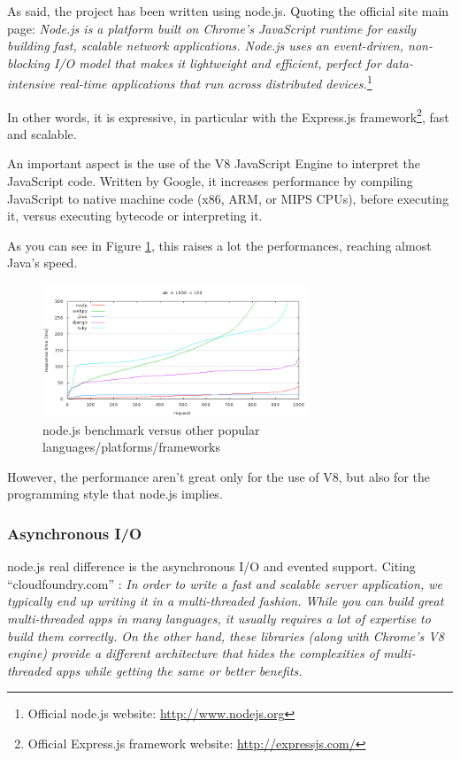 As said, the project has been written using node.js. Quoting the official site main page: \textit{Node.js is a platform built on Chrome's JavaScript runtime for easily building fast, scalable network applications. Node.js uses an event-driven, non-blocking I/O model that makes it lightweight and efficient, perfect for data-intensive real-time applications that run across distributed devices.}\footnote{Official node.js website: \url{http://www.nodejs.org}}

In other words, it is expressive, in particular with the Express.js framework\footnote{Official Express.js framework website: \url{http://expressjs.com/}}, fast and scalable. 

An important aspect is the use of the V8 JavaScript Engine to interpret the JavaScript code. Written by Google, it increases performance by compiling JavaScript to native machine code (x86, ARM, or MIPS CPUs)\cite{website:v8-intro}, before executing it, versus executing bytecode or interpreting it.

As you can see in Figure \ref{fig:nodeBench}, this raises a lot the performances, reaching almost Java's speed.

\begin{figure}[H]
\centering %
\includegraphics[height=150px]{img/node-bench.png}
\caption{node.js benchmark versus other popular languages/platforms/frameworks}
\label{fig:nodeBench}
\end{figure}

However, the performance aren't great only for the use of V8, but also for the programming style that node.js implies.

\subsubsection{Asynchronous I/O}
\label{sec:async}

node.js real difference is the asynchronous I/O and evented support. Citing ``cloudfoundry.com'' \cite{website:cloudfoundry}: \textit{In order to write a fast and scalable server application, we typically end up writing it in a multi-threaded fashion. While you can build great multi-threaded apps in many languages, it usually requires a lot of expertise to build them correctly. On the other hand, these libraries (along with Chrome’s V8 engine) provide a different architecture that hides the complexities of multi-threaded apps while getting the same or better benefits.}

